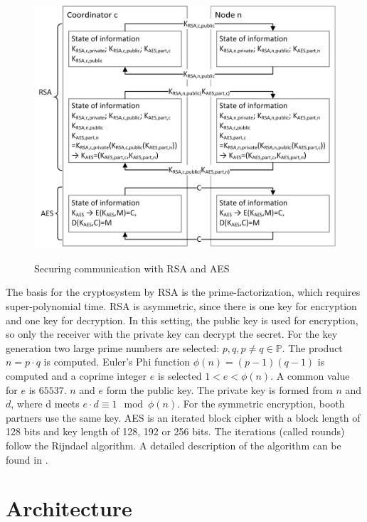 	\begin{figure}[!htbp] %
		\caption{Securing communication with \gls{RSA} and \gls{AES}}
		\includegraphics[scale=1.0]{figures/encryption.png}
		\label{figure:RSA/AES scheme}
	\end{figure}
		
	The basis for the cryptosystem by \gls{RSA} is the prime-factorization, which requires super-polynomial time. \gls{RSA} is asymmetric, since there is one key for encryption and one key for decryption. In this setting, the public key is used for encryption, so only the receiver with the private key can decrypt the secret.
	For the key generation two large prime numbers are selected: $p,q,p\neq q \in \mathbb{P}$. The product $n=p\cdot q$ is computed. Euler's Phi function $\phi (n)=(p-1)(q-1)$ is computed and a coprime integer $e$ is selected $1<e<\phi(n)$. A common value for $e$ is $65537$. $n$ and $e$ form the public key.
	The private key is formed from $n$ and $d$, where d meets $e\cdot d\equiv 1\mod \phi(n)$.
	For the symmetric encryption, booth partners use the same key. \gls{AES} is an iterated block cipher with a block length of 128 bits and key length of 128, 192 or 256 bits. The iterations (called rounds) follow the Rijndael algorithm. A detailed description of the algorithm can be found in \textcite[pp. 20-25]{Delfs2015}.
	
	\FloatBarrier
	\section{Architecture}
	\label{Architecture}
	
